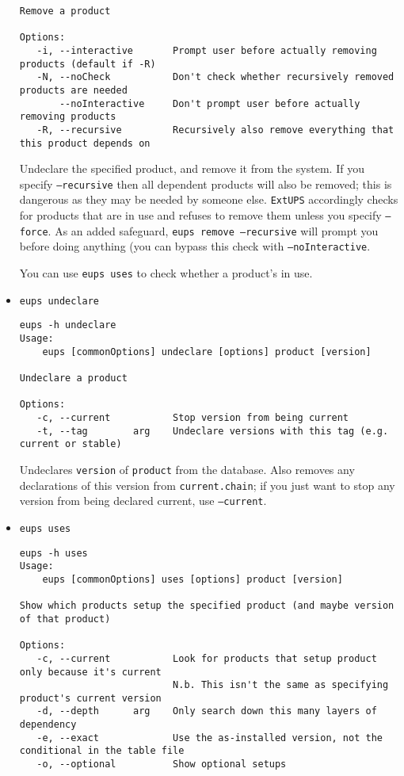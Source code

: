 \documentclass{article}
\newcommand{\code}[1]{\texttt{#1}}
\newcommand{\eups}{\code{ExtUPS}}
\begin{document}
\begin{itemize}
\begin{verbatim}
Remove a product

Options:
   -i, --interactive       Prompt user before actually removing products (default if -R)
   -N, --noCheck           Don't check whether recursively removed products are needed
       --noInteractive     Don't prompt user before actually removing products
   -R, --recursive         Recursively also remove everything that this product depends on
\end{verbatim}

Undeclare the specified product, and remove it from the system. If you specify
\code{--recursive} then all dependent products will also be removed; this is dangerous
as they may be needed by someone else. \eups{} accordingly checks for products
that are in use and refuses to remove them unless you specify \code{--force}.  As
an added safeguard, \code{eups remove --recursive} will prompt you before doing anything
(you can bypass this check with \code{--noInteractive}.

You can use \code{eups uses} to check whether a product's in use.
  

  \item \code{eups undeclare}
\begin{verbatim}
eups -h undeclare
Usage:
    eups [commonOptions] undeclare [options] product [version]

Undeclare a product

Options:
   -c, --current           Stop version from being current
   -t, --tag        arg    Undeclare versions with this tag (e.g. current or stable)
\end{verbatim}
  
Undeclares \code{version} of \code{product} from the database. Also
removes any declarations of this version from \code{current.chain}; if
you just want to stop any version from being declared current, use
\code{--current}.


\item \code{eups uses}
\begin{verbatim}
eups -h uses     
Usage:
    eups [commonOptions] uses [options] product [version]

Show which products setup the specified product (and maybe version of that product)

Options:
   -c, --current           Look for products that setup product only because it's current
                           N.b. This isn't the same as specifying product's current version
   -d, --depth      arg    Only search down this many layers of dependency
   -e, --exact             Use the as-installed version, not the conditional in the table file
   -o, --optional          Show optional setups
\end{verbatim}


\end{itemize}
\end{document}
